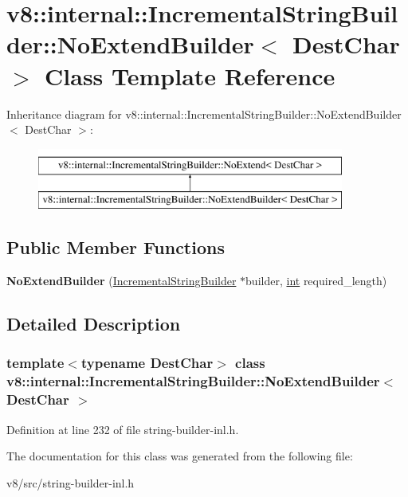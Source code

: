 \hypertarget{classv8_1_1internal_1_1IncrementalStringBuilder_1_1NoExtendBuilder}{}\section{v8\+:\+:internal\+:\+:Incremental\+String\+Builder\+:\+:No\+Extend\+Builder$<$ Dest\+Char $>$ Class Template Reference}
\label{classv8_1_1internal_1_1IncrementalStringBuilder_1_1NoExtendBuilder}
Inheritance diagram for v8\+:\+:internal\+:\+:Incremental\+String\+Builder\+:\+:No\+Extend\+Builder$<$ Dest\+Char $>$\+:\begin{figure}[H]
\begin{center}
\leavevmode
\includegraphics[height=2.000000cm]{classv8_1_1internal_1_1IncrementalStringBuilder_1_1NoExtendBuilder}
\end{center}
\end{figure}
\subsection*{Public Member Functions}
\begin{DoxyCompactItemize}
\item 
\mbox{\label{classv8_1_1internal_1_1IncrementalStringBuilder_1_1NoExtendBuilder_a69a81a8b0da6c0dd8fa4503040ce76b6}} 
{\bfseries No\+Extend\+Builder} (\mbox{\hyperlink{classv8_1_1internal_1_1IncrementalStringBuilder}{Incremental\+String\+Builder}} $\ast$builder, \mbox{\hyperlink{classint}{int}} required\+\_\+length)
\end{DoxyCompactItemize}


\subsection{Detailed Description}
\subsubsection*{template$<$typename Dest\+Char$>$\newline
class v8\+::internal\+::\+Incremental\+String\+Builder\+::\+No\+Extend\+Builder$<$ Dest\+Char $>$}



Definition at line 232 of file string-\/builder-\/inl.\+h.



The documentation for this class was generated from the following file\+:\begin{DoxyCompactItemize}
\item 
v8/src/string-\/builder-\/inl.\+h\end{DoxyCompactItemize}
